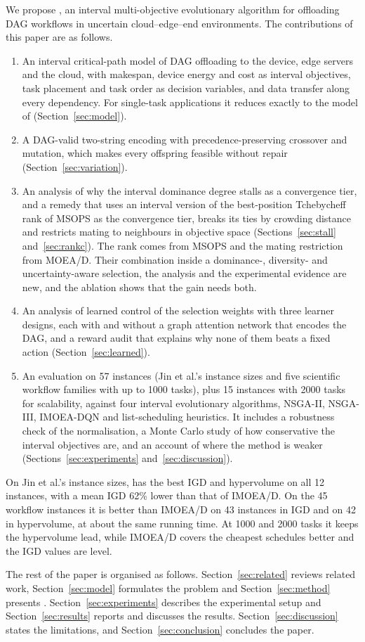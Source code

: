 We propose \ours{}, an interval multi-objective evolutionary algorithm for offloading DAG workflows in uncertain
cloud--edge--end environments. The contributions of this paper are as follows.
\begin{enumerate}
\item An interval critical-path model of DAG offloading to the device, edge servers and the cloud, with makespan,
  device energy and cost as interval objectives, task placement and task order as decision variables, and data transfer
  along every dependency. For single-task applications it reduces exactly to the model of \citet{jin2026imoeadqn}
  (Section~\ref{sec:model}).
\item A DAG-valid two-string encoding with precedence-preserving crossover and mutation, which makes every offspring
  feasible without repair (Section~\ref{sec:variation}).
\item An analysis of why the interval dominance degree stalls as a convergence tier, and a remedy that uses an interval
  version of the best-position Tchebycheff rank of MSOPS \citep{hughes2003msops} as the convergence tier, breaks its ties
  by crowding distance and restricts mating to neighbours in objective space (Sections~\ref{sec:stall}
  and~\ref{sec:rankc}). The rank comes from MSOPS and the mating restriction from MOEA/D. Their combination inside a
  dominance-, diversity- and uncertainty-aware selection, the analysis and the experimental evidence are new, and the
  ablation shows that the gain needs both.
\item An analysis of learned control of the selection weights with three learner designs, each with and without a
  graph attention network that encodes the DAG, and a reward audit that explains why none of them beats a fixed action
  (Section~\ref{sec:learned}).
\item An evaluation on 57 instances (Jin et al.'s instance sizes and five scientific workflow families with up to 1000
  tasks), plus 15 instances with 2000 tasks for scalability, against four interval evolutionary algorithms, NSGA-II,
  NSGA-III, IMOEA-DQN and list-scheduling heuristics. It includes a robustness check of the normalisation, a Monte Carlo
  study of how conservative the interval objectives are, and an account of where the method is weaker
  (Sections~\ref{sec:experiments} and~\ref{sec:discussion}).
\end{enumerate}

On Jin et al.'s instance sizes, \ours{} has the best IGD and hypervolume on all 12 instances, with a mean IGD 62\% lower
than that of IMOEA/D. On the 45 workflow instances it is better than IMOEA/D on 43 instances in IGD and on 42 in
hypervolume, at about the same running time. At 1000 and 2000 tasks it keeps the hypervolume lead, while IMOEA/D covers
the cheapest schedules better and the IGD values are level.

The rest of the paper is organised as follows. Section~\ref{sec:related} reviews related work,
Section~\ref{sec:model} formulates the problem and Section~\ref{sec:method} presents \ours{}.
Section~\ref{sec:experiments} describes the experimental setup and Section~\ref{sec:results} reports and discusses the
results. Section~\ref{sec:discussion} states the limitations, and Section~\ref{sec:conclusion} concludes the paper.
